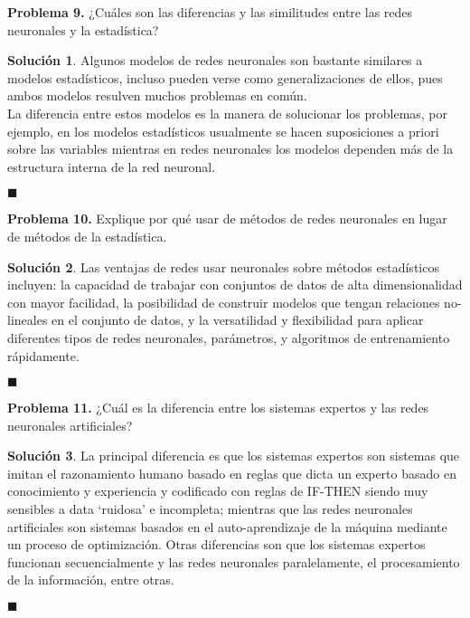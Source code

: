 \documentclass[12pt]{article}
\theoremstyle{plain}
\theoremstyle{definition}
\theoremstyle{definition}
\theoremstyle{definition}
\newtheorem*{solution}{Solución}
\begin{document}
\noindent \textbf{Problema 9.} ¿Cuáles son las diferencias y las similitudes entre las redes neuronales y la estadística?

\begin{solution}
Algunos modelos de redes neuronales son bastante similares a modelos estadísticos, incluso pueden verse como generalizaciones de ellos, pues ambos modelos resulven muchos problemas en común.\\
La diferencia entre estos modelos es la manera de solucionar los problemas, por ejemplo, en los modelos estadísticos usualmente se hacen suposiciones a priori sobre las variables mientras en redes neuronales los modelos dependen más de la estructura interna de la red neuronal. 
\end{solution}
\begin{flushright}
$\blacksquare$
\end{flushright}

\noindent \textbf{Problema 10.} Explique por qué usar de métodos de redes neuronales en lugar de métodos de la estadística.
\begin{solution}
Las ventajas de redes usar neuronales sobre métodos estadísticos incluyen: la capacidad de trabajar con conjuntos de datos de alta dimensionalidad con mayor facilidad, la posibilidad de construir modelos que tengan relaciones no-lineales en el conjunto de datos, y la versatilidad y flexibilidad para aplicar diferentes tipos de redes neuronales, parámetros, y algoritmos de entrenamiento rápidamente.
\end{solution}
\begin{flushright}
$\blacksquare$
\end{flushright}
 
 \noindent \textbf{Problema 11.} ¿Cuál es la diferencia entre los sistemas expertos y las redes neuronales artificiales?
 
 \begin{solution}
 La principal diferencia es que los sistemas expertos son sistemas que imitan el razonamiento humano basado en reglas que dicta un experto basado en conocimiento y experiencia y codificado con reglas de IF-THEN siendo muy sensibles a data `ruidosa' e incompleta; mientras que las redes neuronales artificiales son sistemas basados en el auto-aprendizaje de la máquina mediante un proceso de optimización. Otras diferencias son que los sistemas expertos funcionan secuencialmente y las redes neuronales paralelamente, el procesamiento de la información, entre otras. 
 \end{solution}
 \begin{flushright}
$\blacksquare$
\end{flushright}
 
\end{document}
